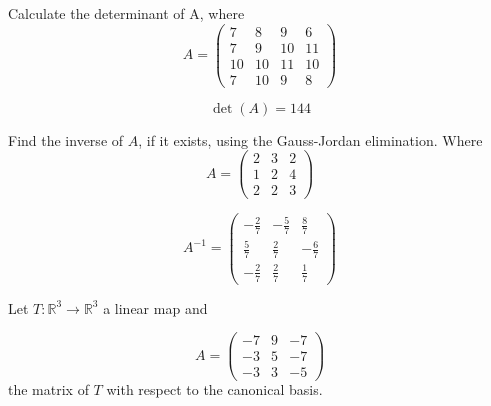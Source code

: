 \begin{questions}

\question Calculate the determinant of A, where
$$
A=\left(\begin{array}{rrrr}
7 & 8 & 9 & 6 \\
7 & 9 & 10 & 11 \\
10 & 10 & 11 & 10 \\
7 & 10 & 9 & 8
\end{array}\right)
$$

\begin{solution}
$$\det(A)=144$$
\end{solution}

\question Find the inverse of $A$, if it exists, using the Gauss-Jordan elimination. Where
$$
A=\left(\begin{array}{rrr}
2 & 3 & 2 \\
1 & 2 & 4 \\
2 & 2 & 3
\end{array}\right)
$$

\begin{solution}
$$A^{-1}=\left(\begin{array}{rrr}
-\frac{2}{7} & -\frac{5}{7} & \frac{8}{7} \\
\frac{5}{7} & \frac{2}{7} & -\frac{6}{7} \\
-\frac{2}{7} & \frac{2}{7} & \frac{1}{7}
\end{array}\right)$$
\end{solution}

\question Let $T:\mathbb{R}^3\rightarrow\mathbb{R}^3$  a linear map and
 
$$
A=\left(\begin{array}{rrr}
-7 & 9 & -7 \\
-3 & 5 & -7 \\
-3 & 3 & -5
\end{array}\right)
$$
the matrix of $T$ with respect to the canonical basis.
\end{questions}
